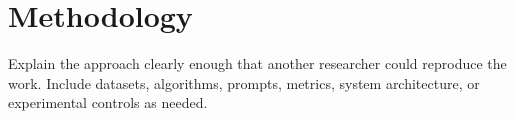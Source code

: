 \section{Methodology}
\label{sec:methodology}

Explain the approach clearly enough that another researcher could reproduce the
work. Include datasets, algorithms, prompts, metrics, system architecture, or
experimental controls as needed.
